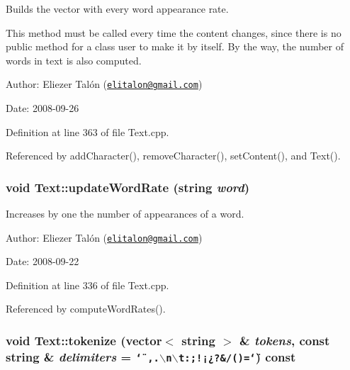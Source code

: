 Builds the vector with every word appearance rate. 

This method must be called every time the content changes, since there is no public method for a class user to make it by itself. By the way, the number of words in text is also computed.

\begin{Desc}
\item[Author:]Eliezer Talón (\href{mailto:elitalon@gmail.com}{\tt elitalon@gmail.com}) \end{Desc}
\begin{Desc}
\item[Date:]2008-09-26 \end{Desc}


Definition at line 363 of file Text.cpp.

Referenced by addCharacter(), removeCharacter(), setContent(), and Text().\hypertarget{class_text_7c2b1a540b470cb7aa37fb42070a674f}{
\subsubsection[updateWordRate]{\setlength{\rightskip}{0pt plus 5cm}void Text::updateWordRate (string {\em word})}}
\label{class_text_7c2b1a540b470cb7aa37fb42070a674f}


Increases by one the number of appearances of a word. 

\begin{Desc}
\item[Author:]Eliezer Talón (\href{mailto:elitalon@gmail.com}{\tt elitalon@gmail.com}) \end{Desc}
\begin{Desc}
\item[Date:]2008-09-22 \end{Desc}


Definition at line 336 of file Text.cpp.

Referenced by computeWordRates().\hypertarget{class_text_09f6b1e475da423ac81305500e05c7d6}{
\subsubsection[tokenize]{\setlength{\rightskip}{0pt plus 5cm}void Text::tokenize (vector$<$ string $>$ \& {\em tokens}, \/  const string \& {\em delimiters} = {\tt \char`\"{}~,.$\backslash$n$\backslash$t:;!¡¿?\&/()=\char`\"{}}) const}}
\label{class_text_09f6b1e475da423ac81305500e05c7d6}



